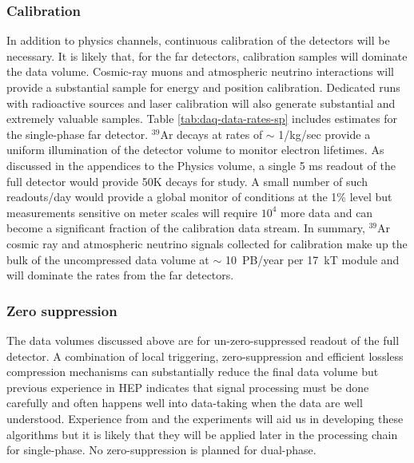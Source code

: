 \subsubsection{
Calibration}
In addition to physics channels, continuous calibration of the detectors will be necessary.  It is likely that, for the far detectors, calibration samples will  dominate the data volume. Cosmic-ray muons and atmospheric neutrino interactions will provide a substantial sample for energy and position calibration.  Dedicated runs with radioactive sources and laser calibration will also generate substantial and extremely valuable samples. Table \ref{tab:daq-data-rates-sp} includes estimates for the single-phase far detector.   
$^{39}$Ar decays at rates of $\sim$ 1/kg/sec provide a uniform illumination of the detector volume to monitor electron lifetimes. As discussed in the appendices to the Physics volume,  a single 5 ms readout of the full detector would provide 50K decays for study.  A small number of such readouts/day would provide a global monitor of conditions at the 1\% level but measurements sensitive on meter scales will require $10^4$ more data and can become a significant fraction of the calibration data stream. In summary, $^{39}$Ar cosmic ray and atmospheric neutrino signals collected for calibration make up the bulk of the uncompressed  data volume at $\sim$ 10~PB/year per 17~kT module and will dominate the rates from the far detectors.  













\subsubsection{Zero suppression}

The data volumes discussed above are for un-zero-suppressed readout of the full detector. A combination of local triggering, zero-suppression and  efficient lossless compression mechanisms can substantially reduce the final data volume but previous experience in HEP indicates that signal processing must be done carefully and often happens well into data-taking when the data are well understood.  Experience from   and the  experiments will aid us in developing these algorithms but it is likely that they will be applied later in the processing chain for single-phase.  No zero-suppression is planned for dual-phase.

